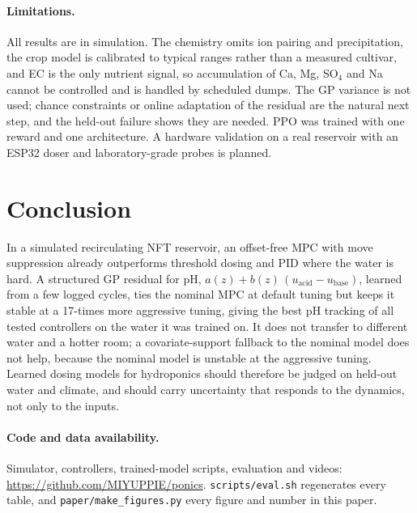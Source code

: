 \documentclass[11pt]{article}
\begin{document}
\paragraph{Limitations.} All results are in simulation. The chemistry omits ion pairing and precipitation, the crop model is calibrated to typical ranges rather than a measured cultivar, and EC is the only nutrient signal, so accumulation of Ca, Mg, SO$_4$ and Na cannot be controlled and is handled by scheduled dumps. The GP variance is not used; chance constraints or online adaptation of the residual are the natural next step, and the held-out failure shows they are needed. PPO was trained with one reward and one architecture. A hardware validation on a real reservoir with an ESP32 doser and laboratory-grade probes is planned.

\section{Conclusion}

In a simulated recirculating NFT reservoir, an offset-free MPC with move suppression already outperforms threshold dosing and PID where the water is hard. A structured GP residual for pH, $a(z) + b(z)\,(u_\text{acid} - u_\text{base})$, learned from a few logged cycles, ties the nominal MPC at default tuning but keeps it stable at a 17-times more aggressive tuning, giving the best pH tracking of all tested controllers on the water it was trained on. It does not transfer to different water and a hotter room; a covariate-support fallback to the nominal model does not help, because the nominal model is unstable at the aggressive tuning. Learned dosing models for hydroponics should therefore be judged on held-out water and climate, and should carry uncertainty that responds to the dynamics, not only to the inputs.

\paragraph{Code and data availability.} Simulator, controllers, trained-model scripts, evaluation and videos: \url{https://github.com/MIYUPPIE/ponics}. \texttt{scripts/eval.sh} regenerates every table, and \texttt{paper/make\_figures.py} every figure and number in this paper.



\end{document}
